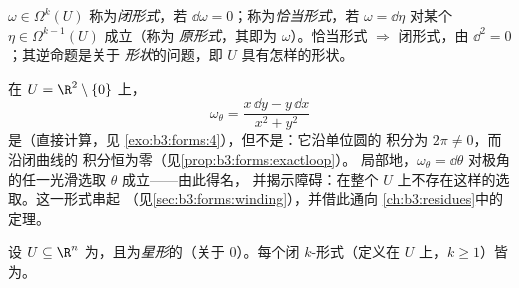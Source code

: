 \begin{definition}\label{def:b3:forms:closedexact}
$\omega \in \Omega^k(U)$ 称为\emph{闭形式}，若
$\dd\omega = 0$；称为\emph{恰当形式}，若
$\omega = \dd\eta$ 对某个 $\eta \in \Omega^{k-1}(U)$ 成立（称为
\emph{原形式}，其即为 $\omega$）。恰当形式 $\Rightarrow$ 闭形式，由
$\dd^2 = 0$；其逆命题是关于
\emph{形状}的问题，即 $U$ 具有怎样的形状。
\end{definition}

\begin{example}[角形式]\label{ex:b3:forms:angular}
在 $U = \R^2 \setminus \{0\}$ 上，
\[
\omega_\theta = \frac{x\,\dd y - y\,\dd x}{x^2 + y^2}
\]
是（直接计算，见
\cref{exo:b3:forms:4}），但不是：它沿单位圆的
积分为 $2\pi \neq 0$，而沿闭曲线的
积分恒为零（见\cref{prop:b3:forms:exactloop}）。
局部地，$\omega_\theta = \dd\theta$ 对极角的任一光滑选取
$\theta$ 成立——由此得名，
并揭示障碍：在整个
$U$ 上不存在这样的选取。这一形式串起
（见\cref{sec:b3:forms:winding}），并借此通向
\cref{ch:b3:residues}中的定理。
\end{example}

\begin{theorem}[庞加莱引理]\label{thm:b3:forms:poincare}
设 $U \subseteq \R^n$ 为，且为\emph{星形}的（关于
$0$）。每个闭 $k$-形式（定义在 $U$ 上，$k \geq 1$）皆
为。
\end{theorem}

